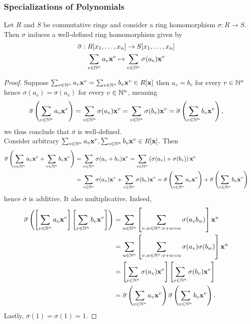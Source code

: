 \subsubsection{Specializations of Polynomials}
\begin{proposition}
    Let $R$ and $S$ be commutative rings and consider a ring homomorphism $\sigma : R \rightarrow S$. Then $\sigma$ induces a well-defined ring homomorphism given by
    \begin{gather*}
        \overline{\sigma} : R[x_1,\dots,x_n]\rightarrow S[x_1,\dots,x_n]\\
        \sum_{v\in \mathbb{N}^n} a_v\mathbf{x}^v \mapsto \sum_{v\in \mathbb{N}^n}\sigma(a_v)\mathbf{x}^v
    \end{gather*}
\end{proposition}
\begin{proof}
    Suppose $\sum_{v\in \mathbb{N}^n} a_v\mathbf{x}^v = \sum_{v\in \mathbb{N}^n} b_v\mathbf{x}^v\in R[\mathbf{x}]$ then $a_v=b_v$ for every $v\in \mathbb{N}^n$ hence $\sigma(a_v)=\sigma(a_v)$ for every $v\in \mathbb{N}^n$, meaning 
    $$\overline{\sigma}\left(\sum_{v\in \mathbb{N}^n} a_v\mathbf{x}^v\right)=\sum_{v\in \mathbb{N}^n } \sigma(a_v)\mathbf{x}^v= \sum_{v\in \mathbb{N}^n } \sigma(b_v)\mathbf{x}^v = \overline{\sigma}\left(\sum_{v\in\mathbb{N}^n}b_v\mathbf{x}^v\right),$$
    we thus conclude that $\overline{\sigma}$ is well-defined.\\
    Consider arbitrary $\sum_{v\in \mathbb{N}^n} a_v\mathbf{x}^v, \sum_{v\in \mathbb{N}^n} b_v\mathbf{x}^v\in R[\mathbf{x}]$. Then 
    \begin{align*}
        \overline{\sigma}\left(\sum_{v\in \mathbb{N}^n} a_v\mathbf{x}^v + \sum_{v\in \mathbb{N}^n}b_v\mathbf{x}^v\right) &= \sum_{v\in \mathbb{N}^n} \sigma(a_v+b_v)\mathbf{x}^v = \sum_{v\in \mathbb{N}^n} \left(\sigma(a_v)+\sigma(b_v)\right) \mathbf{x}^v\\
        &=\sum_{v\in \mathbb{N}^n} \sigma(a_v)\mathbf{x}^v + \sum_{v\in \mathbb{N}^n} \sigma(b_v)\mathbf{x}^v = \overline{\sigma}\left(\sum_{v\in\mathbb{N}^n} a_v\mathbf{x}^v\right)+\overline{\sigma}\left(\sum_{v\in\mathbb{N}^n} b_v\mathbf{x}^v\right)
    \end{align*}
    hence $\overline{\sigma}$ is additive. It also multiplicative. Indeed,
    \begin{align*}
        \overline{\sigma}\left(\left[\sum_{v\in\mathbb{N}^n} a_v\mathbf{x}^v\right]\left[ \sum_{v\in\mathbb{N}^n} b_v\mathbf{x}^v\right]\right) &= \sum_{u\in \mathbb{N}^n}\left[\sum_{v,w\in \mathbb{N}^n : v+w=u} \sigma(a_vb_w)\right] \mathbf{x}^u\\ 
        &= \sum_{u\in \mathbb{N}^n}\left[\sum_{v,w\in \mathbb{N}^n : v+w=u}\sigma(a_v)\sigma(b_w)\right] \mathbf{x}^u\\
        &=\left[\sum_{v\in\mathbb{N}^n} \sigma(a_v)\mathbf{x}^v\right]\left[ \sum_{v\in\mathbb{N}^n} \sigma(b_v)\mathbf{x}^v\right]\\
        &= \overline{\sigma}\left(\sum_{v\in\mathbb{N}^n} a_v\mathbf{x}^v\right)\overline{\sigma}\left(\sum_{v\in\mathbb{N}^n} b_v\mathbf{x}^v\right).
    \end{align*}
    Lastly, $\overline{\sigma}(1)=\sigma(1)=1$.
\end{proof}
